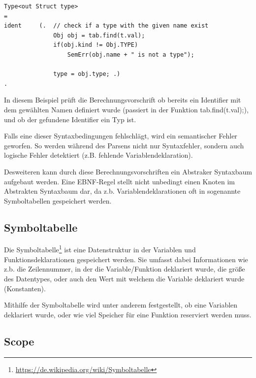 
\begin{lstlisting}[language=EBNF]
Type<out Struct type>
= 
ident     (.  // check if a type with the given name exist
              Obj obj = tab.find(t.val);
              if(obj.kind != Obj.TYPE)
                  SemErr(obj.name + " is not a type");

              type = obj.type; .)
. 
\end{lstlisting}

In diesem Beispiel pr\"uft die Berechnungsvorschrift ob bereits ein Identifier mit dem gew\"ahlten Namen definiert wurde (passiert in der Funktion tab.find(t.val);), und ob der gefundene Identifier ein Typ ist. 

Falls eine dieser Syntaxbedingungen fehlschl\"agt, wird ein semantischer Fehler geworfen. So werden w\"ahrend des Parsens nicht nur Syntaxfehler, sondern auch logische Fehler detektiert (z.B. fehlende Variablendeklaration).

Desweiteren kann durch diese Berechnungsvorschriften ein Abstraker Syntaxbaum aufgebaut werden. Eine EBNF-Regel stellt nicht unbedingt einen Knoten im Abstrakten Syntaxbaum dar, da z.b. Variablendeklarationen oft in sogenannte Symboltabellen gespeichert werden.

\subsection{Symboltabelle}

Die Symboltabelle\footnote{\url{https://de.wikipedia.org/wiki/Symboltabelle}} ist eine Datenstruktur in der Variablen und Funktionsdeklarationen gespeichert werden. Sie umfasst dabei Informationen wie z.b. die Zeilennummer, in der die Variable/Funktion deklariert wurde, die gr\"o\ss{}e des Datentypes, oder auch den Wert mit welchem die Variable deklariert wurde (Konstanten).

Mithilfe der Symboltabelle wird unter anderem festgestellt, ob eine Variablen deklariert wurde, oder wie viel Speicher f\"ur eine Funktion reserviert werden muss.


\subsection{Scope}